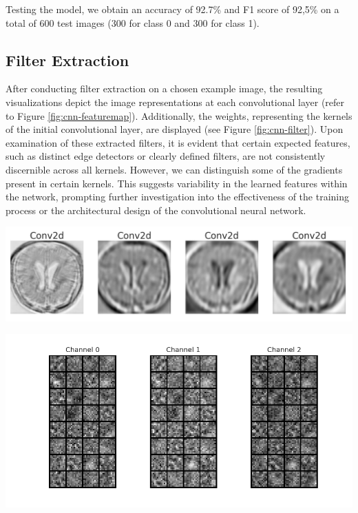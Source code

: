 \documentclass[11pt]{article}
\newenvironment{Figure}
  {\par\medskip\noindent\minipage{\linewidth}}
  {\endminipage\par\medskip}
\begin{document}
\begin{multicols*}{2}
Testing the model, we obtain an accuracy of 92.7\% and F1  score of 92,5\% on a total of 600 test images (300 for class 0 and 300 for class 1).
            
\subsection{Filter Extraction}
After conducting filter extraction on a chosen example image, the resulting visualizations depict the image representations at each convolutional layer (refer to Figure \ref{fig:cnn-featuremap}). Additionally, the weights, representing the kernels of the initial convolutional layer, are displayed (see Figure \ref{fig:cnn-filter}). Upon examination of these extracted filters, it is evident that certain expected features, such as distinct edge detectors or clearly defined filters, are not consistently discernible across all kernels. However, we can distinguish some of the gradients present in certain kernels. This suggests variability in the learned features within the network, prompting further investigation into the effectiveness of the training process or the architectural design of the convolutional neural network.

\begin{Figure}
    \centering
    \includegraphics[width=\linewidth]{images/CNN_FeatureMaps.png}
    \label{fig:cnn-featuremap}
\end{Figure}

\begin{Figure}
    \centering
    \includegraphics[width=\linewidth]{images/CNN_visTensor.png}
    \label{fig:cnn-filter}
\end{Figure}


\end{multicols*}
\end{document}
